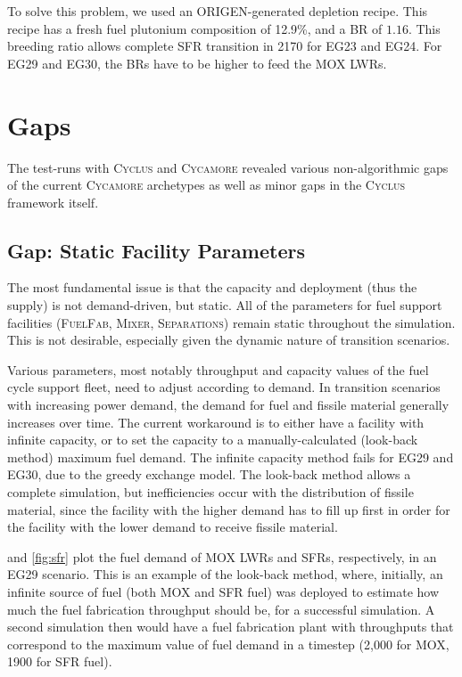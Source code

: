 \documentclass{article}
\newcommand{\Cyclus}{\textsc{Cyclus}\xspace}%
\newcommand{\Cycamore}{\textsc{Cycamore}\xspace}%
\begin{document}
To solve this problem, we used an ORIGEN-generated depletion recipe. This recipe
has a fresh fuel plutonium composition of 12.9\%, and a BR of $1.16$. This breeding
ratio allows complete SFR transition in 2170 for EG23 and EG24. For EG29 and EG30,
the BRs have to be higher to feed the \gls{MOX} \glspl{LWR}. 


\section{Gaps}
The test-runs with \Cyclus and \Cycamore revealed various non-algorithmic gaps
of the current \Cycamore archetypes as well as minor gaps in the \Cyclus framework itself. 

\subsection{Gap: Static Facility Parameters}
The most fundamental issue is that the capacity and deployment (thus the supply) is not
demand-driven, but static. All of the parameters for fuel support facilities (\textsc{FuelFab}\xspace,
\textsc{Mixer}\xspace, \textsc{Separations}\xspace) remain static throughout the simulation.
This is not desirable, especially given the dynamic nature of transition scenarios. 

Various parameters, most notably throughput and capacity values of the fuel cycle support fleet,
need to adjust according to demand. In transition scenarios with increasing power demand, the 
demand for fuel and fissile material generally increases over time. The current workaround is to either
have a facility with infinite capacity, or to set the capacity to a manually-calculated (look-back method)
maximum fuel demand. The infinite capacity method fails for EG29 and EG30, due to the greedy exchange
model. The look-back method allows a complete simulation, but inefficiencies occur with the distribution
of fissile material, since the facility with the higher demand has to fill up first in order for the facility
with the lower demand to receive fissile material. 



 and \cref{fig:sfr} plot the fuel demand of \gls{MOX} \glspl{LWR} and \glspl{SFR},
respectively, in an EG29 scenario. This is an example of the look-back method, where, initially, an infinite source
of fuel (both \gls{MOX} and \gls{SFR} fuel) was deployed to estimate how much the fuel fabrication
throughput should be, for a successful simulation. A second simulation then would have a 
fuel fabrication plant with throughputs that correspond to the maximum value of fuel demand in a timestep
(2,000 for \gls{MOX}, 1900 for \gls{SFR} fuel).
\end{document}
